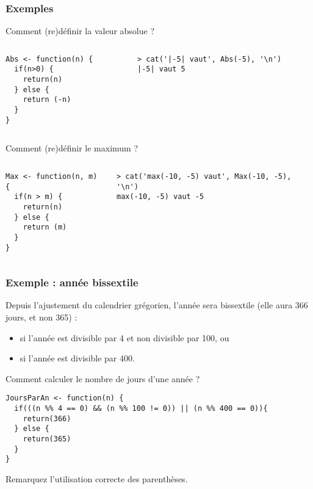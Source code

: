 \documentclass[10pt]{beamer}
\begin{document}
\begin{frame}[fragile]
  \frametitle{Exemples}

  \begin{exampleblock}{Comment (re)définir la valeur absolue ?}
\begin{columns}[c]
\begin{column}{0.4\textwidth}
  \begin{lstlisting}[style=edblock]
Abs <- function(n) {
  if(n>0) {
    return(n)
  } else {
    return (-n)
  }
}
\end{lstlisting}
\end{column}
\begin{column}{0.6\textwidth}
  \begin{lstlisting}
> cat('|-5| vaut', Abs(-5), '\n')
|-5| vaut 5
  \end{lstlisting}
\end{column}
\end{columns}
\end{exampleblock}

  \begin{exampleblock}{Comment (re)définir le maximum ?}
\begin{columns}[c]
\begin{column}{0.4\textwidth}
  \begin{lstlisting}[style=edblock]
Max <- function(n, m) {
  if(n > m) {
    return(n)
  } else {
    return (m)
  }
}
\end{lstlisting}
\end{column}
\begin{column}{0.6\textwidth}
  \begin{lstlisting}
> cat('max(-10, -5) vaut', Max(-10, -5), '\n')
max(-10, -5) vaut -5
\end{lstlisting}
\end{column}
\end{columns}
  \end{exampleblock}


\end{frame}

\begin{frame}[fragile]
  \frametitle{Exemple : année bissextile}
  Depuis l'ajustement du calendrier grégorien, l'année sera bissextile (elle aura 366 jours, et non 365) :
  \begin{itemize}
  \item si l'année est divisible par 4 et non divisible par 100, ou
  \item si l'année est divisible par 400.
  \end{itemize}
  \begin{exampleblock}{Comment calculer le nombre de jours d'une année  ?}


  \begin{lstlisting}[style=edblock]
JoursParAn <- function(n) {
  if(((n %% 4 == 0) && (n %% 100 != 0)) || (n %% 400 == 0)){
    return(366)
  } else {
    return(365)
  }
}
\end{lstlisting}
Remarquez l'utilisation correcte des parenthèses.
\end{exampleblock}
\end{frame}
\end{document}
